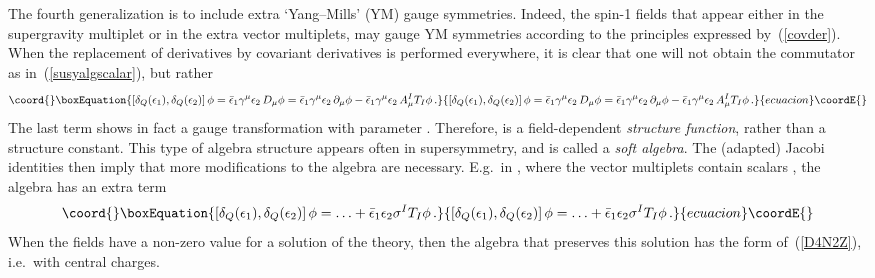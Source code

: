 \documentclass[a4paper,11pt,twoside]{article}
\providecommand{\OliveGreen}[1]{#1}
\providecommand{\Blue}[1]{#1}
\begin{document}
The fourth generalization is to include extra `Yang--Mills' (YM) gauge
symmetries. Indeed, the spin-1 fields that appear either in the
supergravity multiplet or in the extra vector multiplets, may gauge YM
symmetries according to the principles expressed by~(\ref{covder}). When
the replacement of derivatives by covariant derivatives is performed
everywhere, it is clear that one will not obtain the commutator as
in~(\ref{susyalgscalar}), but rather
\begin{equation}\coord{}\boxEquation{
  \left[ \delta_Q (\OliveGreen{\epsilon _1}),\delta_Q (\OliveGreen{\epsilon _2})\right] \Blue{\phi}
  =\OliveGreen{\bar \epsilon _1}\gamma
^\mu \OliveGreen{\epsilon _2}\,D_\mu \Blue{\phi}
 =\OliveGreen{\bar \epsilon _1}\gamma
^\mu \OliveGreen{\epsilon _2}\,\partial _\mu \Blue{\phi}-\OliveGreen{\bar
\epsilon _1}\gamma ^\mu \OliveGreen{\epsilon _2}\, \Blue{A_\mu ^I} T_I
\Blue{\phi}\,.
 \label{SUSYalgGauge}
}{
  \left[ \delta_Q (\OliveGreen{\epsilon _1}),\delta_Q (\OliveGreen{\epsilon _2})\right] \Blue{\phi}
  =\OliveGreen{\bar \epsilon _1}\gamma
^\mu \OliveGreen{\epsilon _2}\,D_\mu \Blue{\phi}
 =\OliveGreen{\bar \epsilon _1}\gamma
^\mu \OliveGreen{\epsilon _2}\,\partial _\mu \Blue{\phi}-\OliveGreen{\bar
\epsilon _1}\gamma ^\mu \OliveGreen{\epsilon _2}\, \Blue{A_\mu ^I} T_I
\Blue{\phi}\,.
 }{ecuacion}\coordE{}\end{equation}
The last term shows in fact a gauge transformation with parameter
\myHighlight{$\OliveGreen{\bar \epsilon _1}\gamma ^\mu \OliveGreen{\epsilon _2}\,
\Blue{A_\mu ^I}$}\coordHE{}. Therefore, \myHighlight{$\gamma ^\mu_{\alpha \beta } \Blue{A_\mu
^I}$}\coordHE{} is a field-dependent \emph{structure function}, rather than a
structure constant. This type of algebra structure appears often in
supersymmetry, and is called a \emph{soft algebra}. The (adapted) Jacobi
identities then imply that more modifications to the algebra are
necessary. E.g.\ in \coordHE{}, where the vector multiplets contain scalars
\coordHE{}, the algebra has an extra term
\begin{equation}\coord{}\boxEquation{
  \left[ \delta_Q (\OliveGreen{\epsilon _1}),\delta_Q (\OliveGreen{\epsilon _2})\right] \Blue{\phi} =\ldots +
\OliveGreen{\bar \epsilon _1}\OliveGreen{\epsilon _2}\Blue{\sigma ^I}
T_I\Blue{\phi}\,.
 \label{QQextraT}
}{
  \left[ \delta_Q (\OliveGreen{\epsilon _1}),\delta_Q (\OliveGreen{\epsilon _2})\right] \Blue{\phi} =\ldots +
\OliveGreen{\bar \epsilon _1}\OliveGreen{\epsilon _2}\Blue{\sigma ^I}
T_I\Blue{\phi}\,.
 }{ecuacion}\coordE{}\end{equation}
When the fields \coordHE{} have a non-zero value for a solution of the
theory, then the algebra that preserves this solution has the form
of~(\ref{D4N2Z}), i.e.\ with central charges.
\end{document}

